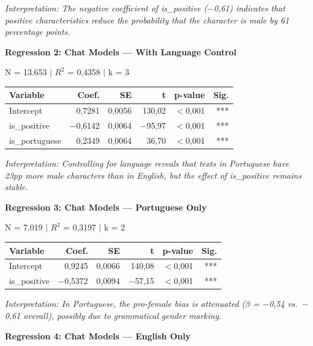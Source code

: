 \documentclass[12pt,a4paper]{article}
\begin{document}
\noindent\textit{Interpretation: The negative coefficient of is\_positive ($-$0,61) indicates that
positive characteristics reduce the probability that the character is
male by 61 percentage points.}

\vspace{0.5cm}
\noindent\textbf{Regression 2: Chat Models --- With Language Control}

\noindent N = 13.653 $|$ $R^2$ = 0,4358 $|$ k = 3

\begin{table}[H]
\centering
\begin{tabular}{lrrrrr}
\toprule
\textbf{Variable} & \textbf{Coef.} & \textbf{SE} & \textbf{t} & \textbf{p-value} & \textbf{Sig.} \\
\midrule
Intercept & 0,7281 & 0,0056 & 130,02 & $<$0,001 & *** \\
is\_positive & $-$0,6142 & 0,0064 & $-$95,97 & $<$0,001 & *** \\
is\_portuguese & 0,2349 & 0,0064 & 36,70 & $<$0,001 & *** \\
\bottomrule
\end{tabular}
\end{table}

\noindent\textit{Interpretation: Controlling for language reveals that texts in Portuguese have
23pp more male characters than in English, but the effect of
is\_positive remains stable.}

\vspace{0.5cm}
\noindent\textbf{Regression 3: Chat Models --- Portuguese Only}

\noindent N = 7.019 $|$ $R^2$ = 0,3197 $|$ k = 2

\begin{table}[H]
\centering
\begin{tabular}{lrrrrr}
\toprule
\textbf{Variable} & \textbf{Coef.} & \textbf{SE} & \textbf{t} & \textbf{p-value} & \textbf{Sig.} \\
\midrule
Intercept & 0,9245 & 0,0066 & 140,08 & $<$0,001 & *** \\
is\_positive & $-$0,5372 & 0,0094 & $-$57,15 & $<$0,001 & *** \\
\bottomrule
\end{tabular}
\end{table}

\noindent\textit{Interpretation: In Portuguese, the pro-female bias is attenuated ($\beta$ = $-$0,54
vs.\ $-$0,61 overall), possibly due to grammatical gender marking.}

\vspace{0.5cm}
\noindent\textbf{Regression 4: Chat Models --- English Only}
\end{document}
